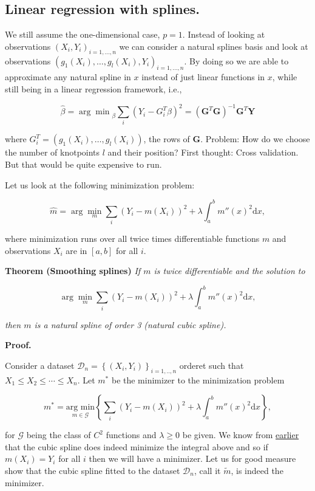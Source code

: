 \documentclass[a4paper,12pt,openany]{book}
\begin{document}
\hypertarget{linear-regression-with-splines.}{%
\subsection{Linear regression with splines.}\label{linear-regression-with-splines.}}

We still assume the one-dimensional case, \(p=1\). Instead of looking at observations \((X_i,Y_i)_{i=1,\dots,n}\) we can consider a natural splines basis and look at observations \((g_1(X_i), \dots, g_l(X_i), Y_i)_{i=1,\dots,n}.\) By doing so we are able to approximate any natural spline in \(x\) instead of just linear functions in \(x\), while still being in a linear regression framework, i.e.,

\[
\hat \beta = {\arg \min }_\beta \sum_i (Y_i - { G_i^T}\beta )^2= (\mathbf G^T\mathbf  G)^{-1}\mathbf  G^T\mathbf Y
\]

where \(G_i^T=(g_1(X_i), \dots, g_l(X_i))\), the rows of \(\mathbf G\). Problem: How do we choose the number of knotpoints \(l\) and their position? First thought: Cross validation. But that would be quite expensive to run.

Let us look at the following minimization problem:

\[
\hat m= \arg\min_{m} \sum_i (Y_i-m(X_i))^2+\lambda\int_a^b m''(x)^2\mathrm dx,
\]

where minimization runs over all twice times differentiable functions \(m\) and observations \(X_i\) are in \([a,b]\) for all \(i\).

\textbf{Theorem (Smoothing splines)} \emph{If \(m\) is twice differentiable and the solution to }

\[
\arg\min_{m} \sum_i (Y_i-m(X_i))^2+\lambda\int_a^b m''(x)^2\mathrm dx,
\]

\emph{then \(m\) is a natural spline of order 3 (natural cubic spline).}

\textbf{Proof.}

Consider a dataset \(\mathcal D_n=\left\{(X_i,Y_i)\right\}_{i=1,..,n}\) orderet such that \(X_1\le X_2\le \cdots \le X_n\). Let \(m^*\) be the minimizer to the minimization problem

\[
m^*=\underset{m\in\mathcal G}{\text{arg min}}\left\{\sum_i (Y_i-m(X_i))^2+\lambda\int_a^b m''(x)^2\mathrm dx\right\},
\]

for \(\mathcal G\) being the class of \(C^2\) functions and \(\lambda\ge 0\) be given. We know from \href{https://random-walks.org/content/misc/ncs/ncs.html}{earlier} that the cubic spline does indeed minimize the integral above and so if \(m(X_i)=Y_i\) for all \(i\) then we will have a minimizer. Let us for good measure show that the cubic spline fitted to the dataset \(\mathcal D_n\), call it \(\tilde m\), is indeed the minimizer.
\end{document}
